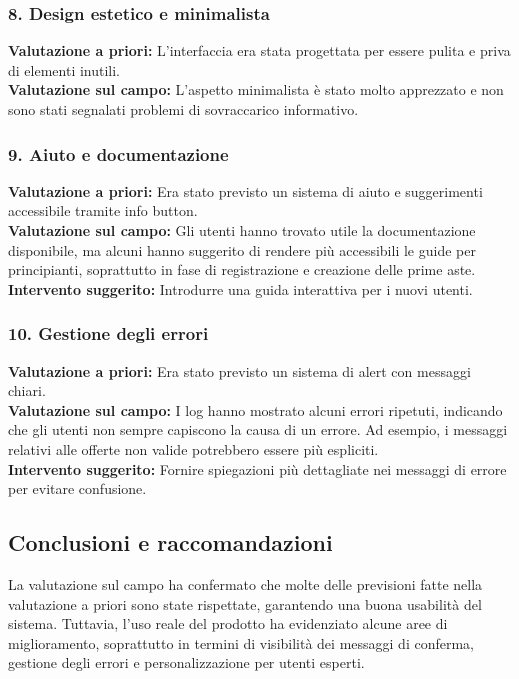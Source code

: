 \subsubsection*{8. Design estetico e minimalista}
\textbf{Valutazione a priori:} L'interfaccia era stata progettata per essere pulita e priva di elementi inutili.\\
\textbf{Valutazione sul campo:} L'aspetto minimalista è stato molto apprezzato e non sono stati segnalati problemi di sovraccarico informativo.

\subsubsection*{9. Aiuto e documentazione}
\textbf{Valutazione a priori:} Era stato previsto un sistema di aiuto e suggerimenti accessibile tramite info button.\\
\textbf{Valutazione sul campo:} Gli utenti hanno trovato utile la documentazione disponibile, ma alcuni hanno suggerito di rendere più accessibili le guide per principianti, soprattutto in fase di registrazione e creazione delle prime aste.\\
\textbf{Intervento suggerito:} Introdurre una guida interattiva per i nuovi utenti.

\subsubsection*{10. Gestione degli errori}
\textbf{Valutazione a priori:} Era stato previsto un sistema di alert con messaggi chiari.\\
\textbf{Valutazione sul campo:} I log hanno mostrato alcuni errori ripetuti, indicando che gli utenti non sempre capiscono la causa di un errore. Ad esempio, i messaggi relativi alle offerte non valide potrebbero essere più espliciti.\\
\textbf{Intervento suggerito:} Fornire spiegazioni più dettagliate nei messaggi di errore per evitare confusione.

\subsection{Conclusioni e raccomandazioni}

La valutazione sul campo ha confermato che molte delle previsioni fatte nella valutazione a priori sono state rispettate, garantendo una buona usabilità del sistema. Tuttavia, l'uso reale del prodotto ha evidenziato alcune aree di miglioramento, soprattutto in termini di visibilità dei messaggi di conferma, gestione degli errori e personalizzazione per utenti esperti.

